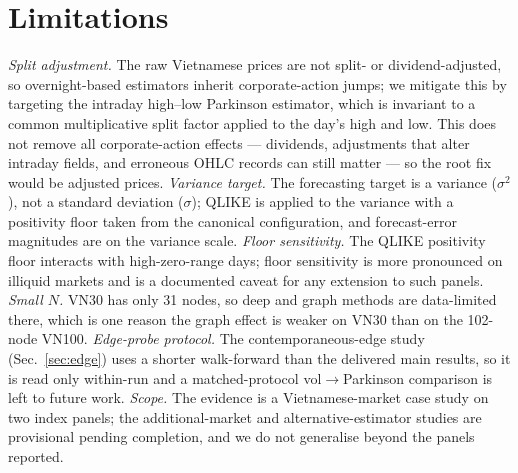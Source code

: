 \documentclass[runningheads]{llncs}
\begin{document}
\section{Limitations}
\emph{Split adjustment.} The raw Vietnamese prices are not split- or dividend-adjusted, so
overnight-based estimators inherit corporate-action jumps; we mitigate this by targeting the intraday
high--low Parkinson estimator, which is invariant to a common multiplicative split factor applied to
the day's high and low. This does not remove all corporate-action effects --- dividends, adjustments
that alter intraday fields, and erroneous OHLC records can still matter --- so the root fix would be
adjusted prices.
\emph{Variance target.} The forecasting target is a variance ($\sigma^2$), not a standard deviation
($\sigma$); QLIKE is applied to the variance with a positivity floor taken from the canonical
configuration, and forecast-error magnitudes are on the variance scale. \emph{Floor sensitivity.} The
QLIKE positivity floor interacts with high-zero-range days; floor sensitivity is more pronounced on
illiquid markets and is a documented caveat for any extension to such panels. \emph{Small $N$.} VN30
has only 31 nodes, so deep and graph methods are data-limited there, which is one reason the graph
effect is weaker on VN30 than on the 102-node VN100. \emph{Edge-probe protocol.} The
contemporaneous-edge study (Sec.~\ref{sec:edge}) uses a shorter walk-forward than the delivered main
results, so it is read only within-run and a matched-protocol vol$\to$Parkinson comparison is left to
future work. \emph{Scope.} The evidence is a Vietnamese-market case study on two index panels; the
additional-market and alternative-estimator studies are provisional pending completion, and we do not
generalise beyond the panels reported.
\end{document}
